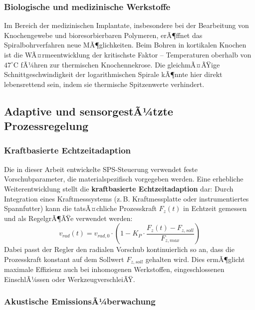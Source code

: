﻿\documentclass[12pt,a4paper]{article}
\begin{document}
\subsubsection{Biologische und medizinische Werkstoffe}

Im Bereich der medizinischen Implantate, insbesondere bei der Bearbeitung von Knochengewebe und bioresorbierbaren Polymeren, erÃ¶ffnet das Spiralbohrverfahren neue MÃ¶glichkeiten. Beim Bohren in kortikalen Knochen ist die WÃ¤rmeentwicklung der kritischste Faktor -- Temperaturen oberhalb von $47^\circ\text{C}$ fÃ¼hren zur thermischen Knochennekrose. Die gleichmÃ¤ÃŸige Schnittgeschwindigkeit der logarithmischen Spirale kÃ¶nnte hier direkt lebensrettend sein, indem sie thermische Spitzenwerte verhindert.

\subsection{Adaptive und sensorgestÃ¼tzte Prozessregelung}

\subsubsection{Kraftbasierte Echtzeitadaption}

Die in dieser Arbeit entwickelte SPS-Steuerung verwendet feste Vorschubparameter, die materialspezifisch vorgegeben werden. Eine erhebliche Weiterentwicklung stellt die \textbf{kraftbasierte Echtzeitadaption} dar: Durch Integration eines Kraftmesssystems (z.\,B. Kraftmessplatte oder instrumentiertes Spannfutter) kann die tatsÃ¤chliche Prozesskraft $F_z(t)$ in Echtzeit gemessen und als RegelgrÃ¶ÃŸe verwendet werden:
\begin{equation}
    v_{rad}(t) = v_{rad,0} \cdot \left(1 - K_P \cdot \frac{F_z(t) - F_{z,soll}}{F_{z,max}}\right)
\end{equation}
Dabei passt der Regler den radialen Vorschub kontinuierlich so an, dass die Prozesskraft konstant auf dem Sollwert $F_{z,soll}$ gehalten wird. Dies ermÃ¶glicht maximale Effizienz auch bei inhomogenen Werkstoffen, eingeschlossenen EinschlÃ¼ssen oder WerkzeugverschleiÃŸ.

\subsubsection{Akustische EmissionsÃ¼berwachung}
\end{document}
